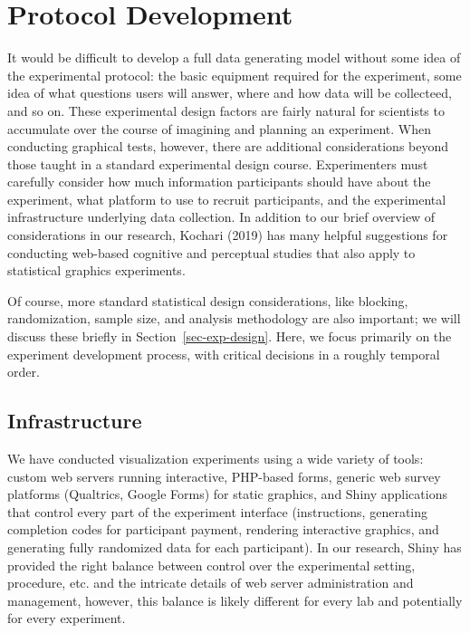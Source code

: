 \documentclass[
  10pt,
  letterpaper,
  DIV=11,
  numbers=noendperiod]{scrartcl}
\begin{document}
\section{Protocol Development}\label{sec-exp-dev}

It would be difficult to develop a full data generating model without
some idea of the experimental protocol: the basic equipment required for
the experiment, some idea of what questions users will answer, where and
how data will be collecteed, and so on. These experimental design
factors are fairly natural for scientists to accumulate over the course
of imagining and planning an experiment. When conducting graphical
tests, however, there are additional considerations beyond those taught
in a standard experimental design course. Experimenters must carefully
consider how much information participants should have about the
experiment, what platform to use to recruit participants, and the
experimental infrastructure underlying data collection. In addition to
our brief overview of considerations in our research, Kochari (2019) has
many helpful suggestions for conducting web-based cognitive and
perceptual studies that also apply to statistical graphics experiments.

Of course, more standard statistical design considerations, like
blocking, randomization, sample size, and analysis methodology are also
important; we will discuss these briefly in
Section~\ref{sec-exp-design}. Here, we focus primarily on the experiment
development process, with critical decisions in a roughly temporal
order.

\subsection{Infrastructure}\label{infrastructure}

We have conducted visualization experiments using a wide variety of
tools: custom web servers running interactive, PHP-based forms, generic
web survey platforms (Qualtrics, Google Forms) for static graphics, and
Shiny applications that control every part of the experiment interface
(instructions, generating completion codes for participant payment,
rendering interactive graphics, and generating fully randomized data for
each participant). In our research, Shiny has provided the right balance
between control over the experimental setting, procedure, etc. and the
intricate details of web server administration and management, however,
this balance is likely different for every lab and potentially for every
experiment.
\end{document}
